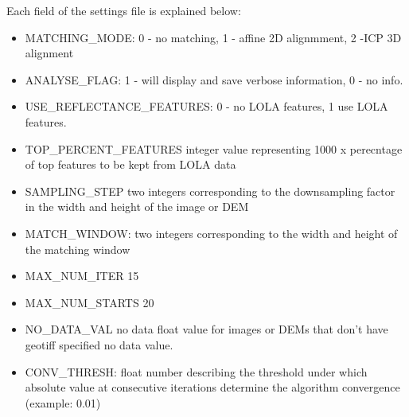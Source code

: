 Each field of the settings file is explained below:
\begin{itemize}
\item{MATCHING\_MODE}: 0 - no matching, 1 - affine 2D alignmment, 2 -ICP 3D alignment\\
\item{ANALYSE\_FLAG}:  1 - will display and save verbose information, 0 - no info.\\
\item{USE\_REFLECTANCE\_FEATURES}: 0 - no LOLA features, 1 use LOLA features.\\ 
\item{TOP\_PERCENT\_FEATURES} integer value representing 1000 x perecntage of top features to be kept from LOLA data\\
\item{SAMPLING\_STEP} two integers corresponding to the downsampling factor in the width and height of the image or DEM\\
\item{MATCH\_WINDOW}: two integers corresponding to the width and height of the matching window\\
\item{MAX\_NUM\_ITER} 15\\
\item{MAX\_NUM\_STARTS} 20\\
\item{NO\_DATA\_VAL} no data float value for images or DEMs that don't have geotiff specified no data value.\\
\item{CONV\_THRESH}: float number describing the threshold under which absolute value at consecutive iterations determine 
                                the algorithm convergence (example: 0.01)\\
\end{itemize}



